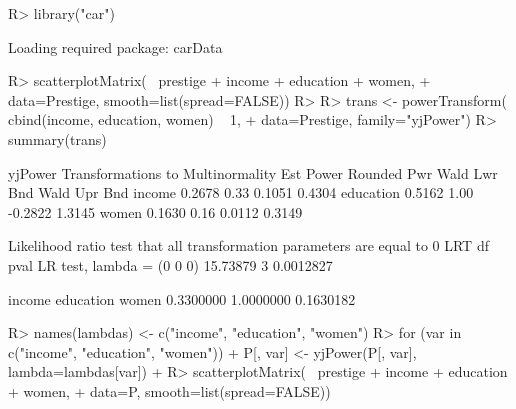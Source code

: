 \documentclass[
]{jss}
\begin{document}
\begin{CodeChunk}
\begin{CodeInput}
R> library("car")
\end{CodeInput}
\begin{CodeOutput}
Loading required package: carData
\end{CodeOutput}
\begin{CodeInput}
R> scatterplotMatrix(~ prestige + income + education + women,
+                   data=Prestige, smooth=list(spread=FALSE))
R> 
R> trans <- powerTransform( cbind(income, education, women) ~ 1,
+                          data=Prestige, family="yjPower")
R> summary(trans)
\end{CodeInput}
\begin{CodeOutput}
yjPower Transformations to Multinormality 
          Est Power Rounded Pwr Wald Lwr Bnd Wald Upr Bnd
income       0.2678        0.33       0.1051       0.4304
education    0.5162        1.00      -0.2822       1.3145
women        0.1630        0.16       0.0112       0.3149

 Likelihood ratio test that all transformation parameters are equal to 0
                               LRT df      pval
LR test, lambda = (0 0 0) 15.73879  3 0.0012827
\end{CodeOutput}
\begin{CodeOutput}
   income education     women 
0.3300000 1.0000000 0.1630182 
\end{CodeOutput}
\begin{CodeInput}
R> names(lambdas) <- c("income", "education", "women")
R> for (var in c("income", "education", "women")){
+   P[, var] <- yjPower(P[, var], lambda=lambdas[var])
+ }
R> scatterplotMatrix(~ prestige + income + education + women,
+                   data=P, smooth=list(spread=FALSE))
\end{CodeInput}
\begin{figure}


\end{figure}
\end{CodeChunk}
\end{document}
